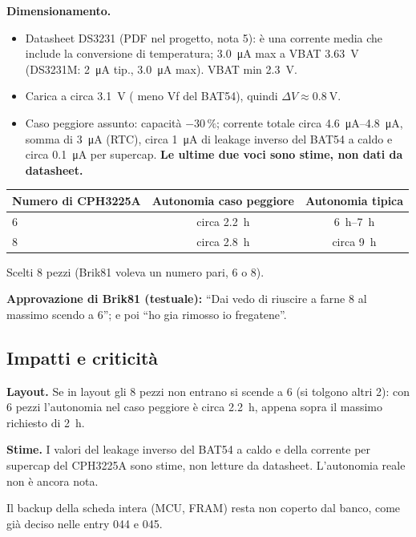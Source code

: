 \textbf{Dimensionamento.}
\begin{itemize}
  \item Datasheet DS3231 (PDF nel progetto, nota 5):  è una corrente media che include la conversione di temperatura; \SI{3,0}{\micro\ampere} max a VBAT \SI{3,63}{\volt} (DS3231M: \SI{2}{\micro\ampere} tip., \SI{3,0}{\micro\ampere} max). VBAT min \SI{2,3}{\volt}.
  \item Carica a circa \SI{3,1}{\volt} ( meno Vf del BAT54), quindi $\Delta V\approx\SI{0,8}{\volt}$.
  \item Caso peggiore assunto: capacità $-30\,\%$; corrente totale circa \SIrange{4,6}{4,8}{\micro\ampere}, somma di \SI{3}{\micro\ampere} (RTC), circa \SI{1}{\micro\ampere} di leakage inverso del BAT54 a caldo e circa \SI{0,1}{\micro\ampere} per supercap. \textbf{Le ultime due voci sono stime, non dati da datasheet.}
\end{itemize}
\begin{center}
\begin{tabular}{@{}lcc@{}}
\toprule
Numero di CPH3225A & Autonomia caso peggiore & Autonomia tipica\\
\midrule
6 & circa \SI{2,2}{\hour} & \SIrange{6}{7}{\hour}\\
8 & circa \SI{2,8}{\hour} & circa \SI{9}{\hour}\\
\bottomrule
\end{tabular}
\end{center}
Scelti 8 pezzi (Brik81 voleva un numero pari, 6 o 8).

\textbf{Approvazione di Brik81 (testuale):} ``Dai vedo di riuscire a farne 8 al massimo scendo a 6''; e poi ``ho gia rimosso io fregatene''.

\subsection{Impatti e criticità}
\begin{notebox}
\textbf{Layout.} Se in layout gli 8 pezzi non entrano si scende a 6 (si tolgono altri 2): con 6 pezzi l'autonomia nel caso peggiore è circa \SI{2,2}{\hour}, appena sopra il massimo richiesto di \SI{2}{\hour}.
\end{notebox}
\begin{notebox}
\textbf{Stime.} I valori del leakage inverso del BAT54 a caldo e della corrente per supercap del CPH3225A sono stime, non letture da datasheet. L'autonomia reale non è ancora nota.
\end{notebox}
Il backup della scheda intera (MCU, FRAM) resta non coperto dal banco, come già deciso nelle entry 044 e 045.

